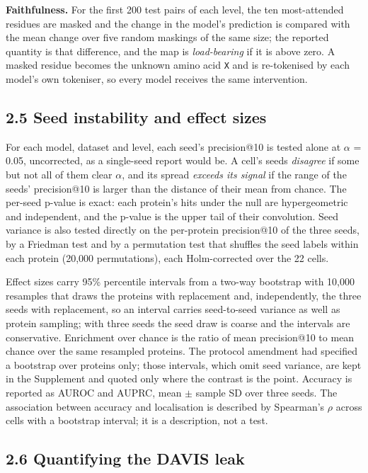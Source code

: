 \textbf{Faithfulness.} For the first 200 test pairs of each level, the ten most-attended residues are masked and the change in the model's prediction is compared with the mean change over five random maskings of the same size; the reported quantity is that difference, and the map is \emph{load-bearing} if it is above zero. A masked residue becomes the unknown amino acid \texttt{X} and is re-tokenised by each model's own tokeniser, so every model receives the same intervention.

\subsection{2.5 Seed instability and effect sizes}\label{seed-instability-and-effect-sizes}

For each model, dataset and level, each seed's precision@10 is tested alone at $\alpha$ = 0.05, uncorrected, as a single-seed report would be. A cell's seeds \emph{disagree} if some but not all of them clear $\alpha$, and its spread \emph{exceeds its signal} if the range of the seeds' precision@10 is larger than the distance of their mean from chance. The per-seed p-value is exact: each protein's hits under the null are hypergeometric and independent, and the p-value is the upper tail of their convolution. Seed variance is also tested directly on the per-protein precision@10 of the three seeds, by a Friedman test and by a permutation test that shuffles the seed labels within each protein (20,000 permutations), each Holm-corrected over the 22 cells.

Effect sizes carry 95\% percentile intervals from a two-way bootstrap with 10,000 resamples that draws the proteins with replacement and, independently, the three seeds with replacement, so an interval carries seed-to-seed variance as well as protein sampling; with three seeds the seed draw is coarse and the intervals are conservative. Enrichment over chance is the ratio of mean precision@10 to mean chance over the same resampled proteins. The protocol amendment had specified a bootstrap over proteins only; those intervals, which omit seed variance, are kept in the Supplement and quoted only where the contrast is the point. Accuracy is reported as AUROC and AUPRC, mean $\pm$ sample SD over three seeds. The association between accuracy and localisation is described by Spearman's $\rho$ across cells with a bootstrap interval; it is a description, not a test.

\subsection{2.6 Quantifying the DAVIS leak}\label{quantifying-the-davis-leak}

